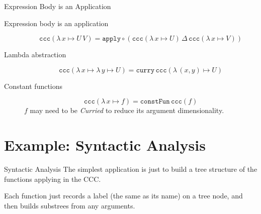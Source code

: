 \documentclass[10pt]{beamer}
\newcommand{\apply}{\mathtt{apply}}
\newcommand{\curry}{\mathtt{curry}}
\newcommand{\lamf}[2]{\ensuremath{\lambda\, #1 \mapsto #2}}
\newcommand{\ccc}{\ensuremath{\mathtt{ccc}}}
\newcommand{\lamtoccc}[1]{\ensuremath{\ccc (#1)}}
\newcommand{\delprod}[2]{\ensuremath{#1\,\Delta\,#2}}
\newcommand{\constFun}{\ensuremath{\mathtt{constFun}}}
\theoremstyle{definition}
\theoremstyle{remark}
\numberwithin{equation}{section}
\begin{document}
\begin{frame}[fragile]{Expression Body is an Application}
  \begin{description}
    \item[Expression body is an application]
      $$\lamtoccc{\lamf{x}{U\,V}} = \apply \circ (\delprod{\lamtoccc{\lamf{x}{U}}}{\lamtoccc{\lamf{x}{V}}})$$
    \item[Lambda abstraction]
      $$\lamtoccc{\lamf{x}{\lamf{y}{U}}} = \curry\, \lamtoccc{\lamf{(x,y)}{U}}$$
    \item[Constant functions]
      $$\lamtoccc{\lamf{x}{f}} = \constFun\, \lamtoccc{f}$$
      $f$ may need to be \emph{Curried} to reduce its argument dimensionality.
  \end{description}
\end{frame}

\section{Example: Syntactic Analysis} %

\begin{frame}[fragile]{Syntactic Analysis}
  The simplest application is just to build a tree structure of the functions applying in the CCC.

  Each function just records a label (the same as its name) on a tree node, and then builds substrees from any arguments.
\end{frame}

\begin{frame}[fragile]{}
\end{frame}

\begin{frame}[fragile]{}
\end{frame}

\begin{frame}[fragile]{}
\end{frame}

\begin{frame}[fragile]{}
\end{frame}

\begin{frame}[fragile]{}
\end{frame}

\begin{frame}[fragile]{}
\end{frame}

\begin{frame}[fragile]{}
\end{frame}
\end{document}
